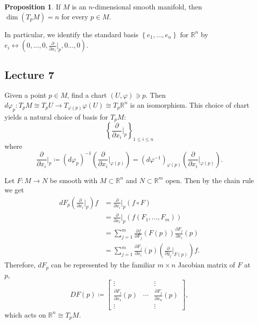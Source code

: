 \documentclass[10pt,letterpaper,cm]{nupset}
\theoremstyle{definition}
\theoremstyle{theorem}
\newtheorem{prop}[definition]{Proposition}
\theoremstyle{remark}
\newcommand{\R}{\mathbb R}
\newcommand{\1}{\mathbf{1}}
\newcommand{\0}{\vec 0}
\begin{document}
\begin{prop}
If $M$ is an $n$-dimensional smooth manifold, then $\dim(T_pM) =n$ for every $p\in M$.
\end{prop}

In particular, we identify the standard basis $\left\{e_1, \ldots, e_n\right\}$ for $\R^n$ by $e_i \leftrightarrow \left(0, \ldots, 0, \frac{\partial}{\partial{x_i}}\bigr\rvert_p, 0 \ldots, 0\right)$.

\subsection{Lecture 7}


Given a point $p\in M$, find a chart $\left(U, \varphi\right)\ni p$. Then $d\varphi_p : T_pM \cong T_pU\to T_{\varphi(p)}\varphi(U) \cong T_p \R^n$ is an isomorphism. This choice of chart yields a natural choice of basis for $T_pM$: $$\left\{\frac{\partial}{\partial{x_i}}\bigr\rvert_{p} \right\}_{1\leq i \leq n}$$ where 
\[ \label{eqn:basis}
\frac{\partial}{\partial{x_i}}\bigr\rvert_{p}\coloneqq  \left(d\varphi_p\right)^{-1}\left(\frac{\partial}{\partial{x_i}}\bigr\rvert_{\varphi(p)}\right) = \left(d\varphi^{-1}\right)_{\varphi(p)}\left(\frac{\partial}{\partial{x_i}}\bigr\rvert_{\varphi(p)}\right). \tag{$\ast$}
\]

\smallskip

Let $F: M \to N$ be smooth with $M\subset \R^n$ and $N \subset \R^m$ open. Then by the chain rule we get 
\begin{align*}
dF_p\left(\frac{\partial}{\partial{x_i}}\bigr\rvert_{p}\right)f & = \frac{\partial}{\partial{x_i}}\bigr\rvert_{p}(f \circ F) 
\\ & = \frac{\partial}{\partial{x_i}}\bigr\rvert_{p}(f(F_1, \ldots, F_m)) 
\\ & =\sum_{j=1}^m  \frac{\partial{f}}{\partial{F_j}}(F(p))\frac{\partial{F_j}}{\partial{x_i}}(p)
\\ & = \sum_{j=1}^m \frac{\partial{F_j}}{\partial{x_i}}(p) \left(\frac{\partial}{\partial{y_j}}\bigr\rvert_{F(p)}\right)f.
\end{align*} Therefore, $dF_p$ can be represented by the familiar $m\times n$ Jacobian matrix of $F$ at $p$, 
 $$DF(p) \coloneqq  \begin{bmatrix}  \vdots &  & \vdots \\ \frac{\partial{F_j}}{\partial{x_1}}(p)  & \cdots & \frac{\partial{F_j}}{\partial{x_n}}(p)  \\ \vdots & & \vdots  
\end{bmatrix},$$ which acts on $\R^n \cong T_pM$.
\end{document}
